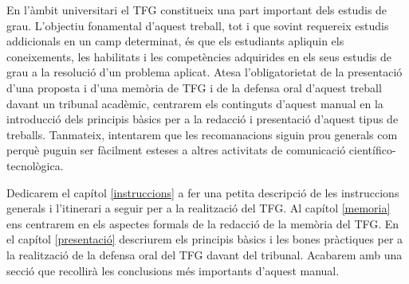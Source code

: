 En l'àmbit universitari el \acf{TFG} constitueix una part important dels estudis de grau. L'objectiu fonamental d'aquest treball, tot i que sovint requereix estudis addicionals en un camp determinat, és que els estudiants apliquin els coneixements, les habilitats i les competències adquirides en els seus estudis de grau a la resolució d'un problema aplicat. Atesa l'obligatorietat de la presentació d'una proposta i d'una memòria de \acf{TFG} i de la defensa oral d'aquest treball davant un tribunal acadèmic, centrarem els continguts d'aquest manual en la introducció dels principis bàsics per a la redacció i presentació d'aquest tipus de treballs. Tanmateix, intentarem que les recomanacions siguin prou generals com perquè puguin ser fàcilment esteses a altres activitats de comunicació científico-tecnològica.

Dedicarem el capítol \ref{instruccions} a fer una petita descripció de les instruccions generals i l'itinerari a seguir per a la realització del \ac{TFG}. Al capítol  \ref{memoria} ens centrarem en els aspectes formals de la redacció de la memòria del \ac{TFG}. En el capítol \ref{presentació} descriurem els principis bàsics i les bones pràctiques per a la realització de la defensa oral del \ac{TFG} davant del tribunal. Acabarem amb una secció que recollirà les conclusions més importants d'aquest manual.

